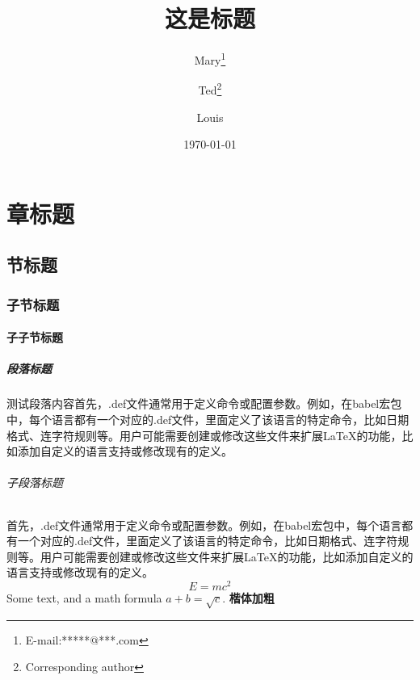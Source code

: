 \documentclass[
    12pt, 
    a4paper,
    scheme=chinese, 
    oneside, 
    openany,   %
    fontset=yanming, 
    sub3section,
    linespread = 1.389
    ]{ctexbook}
\title{这是标题}
\author{ Mary\thanks{E-mail:*****@***.com}
\and Ted\thanks{Corresponding author}
\and Louis}
\date{\today}
\begin{document}
\maketitle

\tableofcontents


\chapter{章标题}
\zhlipsum[1]
\section{节标题}
\zhlipsum[1]
\subsection{子节标题}
\zhlipsum[1]
\subsubsection{子子节标题}

\paragraph{段落标题} 测试段落内容首先，.def文件通常用于定义命令或配置参数。例如，在babel宏包中，每个语言都有一个对应的.def文件，里面定义了该语言的特定命令，比如日期格式、连字符规则等。用户可能需要创建或修改这些文件来扩展LaTeX的功能，比如添加自定义的语言支持或修改现有的定义。
\subparagraph{子段落标题}首先，.def文件通常用于定义命令或配置参数。例如，在babel宏包中，每个语言都有一个对应的.def文件，里面定义了该语言的特定命令，比如日期格式、连字符规则等。用户可能需要创建或修改这些文件来扩展LaTeX的功能，比如添加自定义的语言支持或修改现有的定义。
\begin{equation}
    E = mc^2
\end{equation}
Some text, and a math formula \(a+b=\sqrt{c}\).
\textbf{\textsf 楷体加粗}
\end{document}
